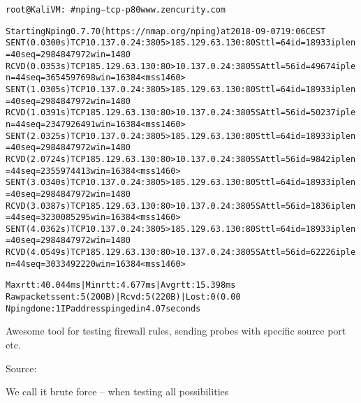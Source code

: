 \documentclass[Screen16to9,17pt]{foils}
\begin{document}
\begin{alltt}\footnotesize
root@KaliVM:~# nping --tcp -p 80 www.zencurity.com

Starting Nping 0.7.70 ( https://nmap.org/nping ) at 2018-09-07 19:06 CEST
SENT (0.0300s) TCP 10.137.0.24:3805 > 185.129.63.130:80 S ttl=64 id=18933 iplen=40  seq=2984847972 win=1480
RCVD (0.0353s) TCP 185.129.63.130:80 > 10.137.0.24:3805 SA ttl=56 id=49674 iplen=44  seq=3654597698 win=16384 <mss 1460>
SENT (1.0305s) TCP 10.137.0.24:3805 > 185.129.63.130:80 S ttl=64 id=18933 iplen=40  seq=2984847972 win=1480
RCVD (1.0391s) TCP 185.129.63.130:80 > 10.137.0.24:3805 SA ttl=56 id=50237 iplen=44  seq=2347926491 win=16384 <mss 1460>
SENT (2.0325s) TCP 10.137.0.24:3805 > 185.129.63.130:80 S ttl=64 id=18933 iplen=40  seq=2984847972 win=1480
RCVD (2.0724s) TCP 185.129.63.130:80 > 10.137.0.24:3805 SA ttl=56 id=9842 iplen=44  seq=2355974413 win=16384 <mss 1460>
SENT (3.0340s) TCP 10.137.0.24:3805 > 185.129.63.130:80 S ttl=64 id=18933 iplen=40  seq=2984847972 win=1480
RCVD (3.0387s) TCP 185.129.63.130:80 > 10.137.0.24:3805 SA ttl=56 id=1836 iplen=44  seq=3230085295 win=16384 <mss 1460>
SENT (4.0362s) TCP 10.137.0.24:3805 > 185.129.63.130:80 S ttl=64 id=18933 iplen=40  seq=2984847972 win=1480
RCVD (4.0549s) TCP 185.129.63.130:80 > 10.137.0.24:3805 SA ttl=56 id=62226 iplen=44  seq=3033492220 win=16384 <mss 1460>

Max rtt: 40.044ms | Min rtt: 4.677ms | Avg rtt: 15.398ms
Raw packets sent: 5 (200B) | Rcvd: 5 (220B) | Lost: 0 (0.00%)
Nping done: 1 IP address pinged in 4.07 seconds
\end{alltt}

Awesome tool for testing firewall rules, sending probes with specific source port etc.



Source:




\begin{list1}
\item We call it brute force -- when testing all possibilities
\end{list1}
\end{document}

